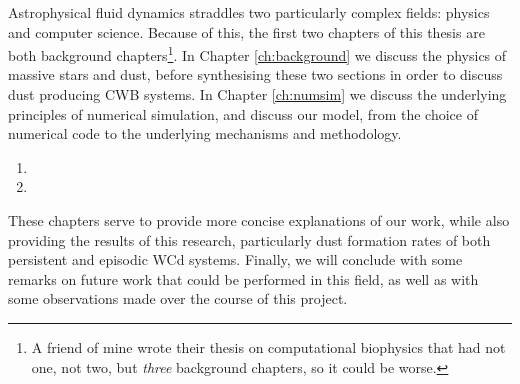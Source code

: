 Astrophysical fluid dynamics straddles two particularly complex fields: physics and computer science.
Because of this, the first two chapters of this thesis are both background chapters\footnote{A friend of mine wrote their thesis on computational biophysics that had not one, not two, but \emph{three} background chapters, so it could be worse.}.
In Chapter \ref{ch:background} we discuss the physics of massive stars and dust, before synthesising these two sections in order to discuss dust producing CWB systems.
In Chapter \ref{ch:numsim} we discuss the underlying principles of numerical simulation, and discuss our model, from the choice of numerical code to the underlying mechanisms and methodology.

\begin{enumerate}
  \item {}
  \item {}
\end{enumerate}

\noindent
These chapters serve to provide more concise explanations of our work, while also providing the results of this research, particularly dust formation rates of both persistent and episodic WCd systems.
Finally, we will conclude with some remarks on future work that could be performed in this field, as well as with some observations made over the course of this project.